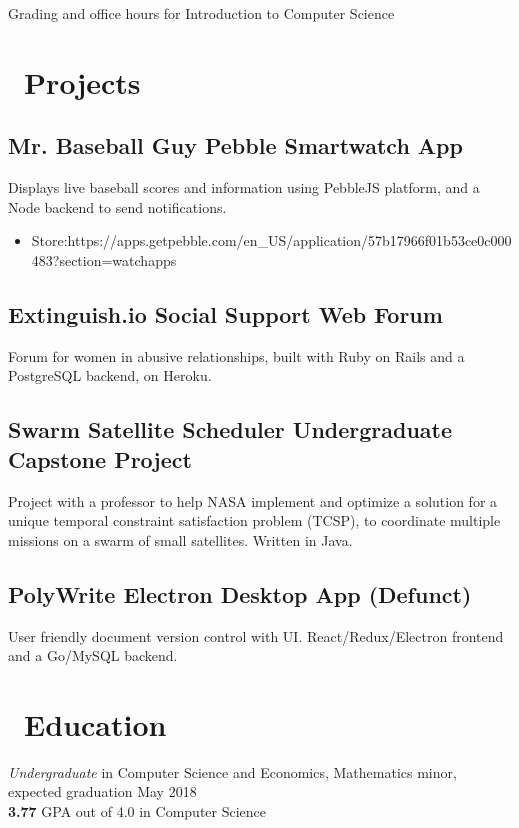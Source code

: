 \documentclass{resume}
\begin{document}
\space
Grading and office hours for Introduction to Computer Science


\section{\faWrench\ Projects}
\subsection{\textbf{Mr. Baseball Guy} Pebble Smartwatch App}
Displays live baseball scores and information using PebbleJS platform, and a Node backend to send notifications.
\begin{itemize}
  \item Store:\quad https://apps.getpebble.com/en\_US/application/57b17966f01b53ce0c000483?section=watchapps
\end{itemize}
\subsection{\textbf{Extinguish.io} Social Support Web Forum}
Forum for women in abusive relationships, built with Ruby on Rails and a PostgreSQL backend, on Heroku.
\subsection{\textbf{Swarm Satellite Scheduler} Undergraduate Capstone Project}
Project with a professor to help NASA implement and optimize a solution for a unique temporal constraint satisfaction problem (TCSP), to coordinate multiple missions on a swarm of small satellites. Written in Java. 
\subsection{\textbf{PolyWrite} Electron Desktop App (Defunct)}
User friendly document version control with UI. React/Redux/Electron frontend and a Go/MySQL backend.

\section{\faGraduationCap\ Education}
\textit{Undergraduate} in Computer Science and Economics, Mathematics minor, expected graduation May 2018 \\
\textbf{3.77} GPA out of 4.0 in Computer Science

%
%
\end{document}
